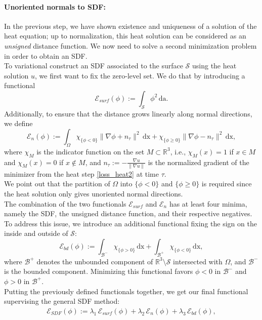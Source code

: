 \documentclass[12pt,openany]{book}
\newcommand{\R}{\mathbb{R}}
\def\S{\mathcal{S}}
\theoremstyle{plainnormal}
\theoremstyle{remark}
\begin{document}
\paragraph{Unoriented normals to SDF:}
In the previous step, we have shown existence and uniqueness of a solution of the heat equation; up to normalization, this heat solution can be considered as an \emph{unsigned} distance function. We now need to solve a second minimization problem in order to obtain an SDF.\\
To variational construct an SDF associated to the surface $\mathcal{S}$ using the heat solution $u$, we first want to fix the zero-level set. We do that by introducing a functional $$\mathcal{E}_{surf}(\phi) := \int_\mathcal{S} \phi^2 \,\mathrm{da}.$$
Additionally, to ensure that the distance grows linearly along normal directions, we define $$\mathcal{E}_{n}(\phi) := \int_\Omega \chi_{\{\phi < 0\}} \|\nabla \phi + n_\tau\|^2 \,\mathrm{dx} + \chi_{\{\phi \geq 0\}} \|\nabla \phi - n_\tau\|^2 \,\mathrm{dx},$$
where $\chi_M$ is the indicator function on the set $M\subset \R^3$, i.e., $\chi_M(x) = 1$ if $x\in M$ and $\chi_M(x) = 0$ if $x\notin M$, and  $n_\tau := - \frac{\nabla u}{\|\nabla u\|}$ is the normalized gradient of the minimizer from the heat step \eqref{loss_heat2} at time $\tau$.\\ 
We point out that the partition of $\Omega$ into $\{\phi < 0\}$ and $\{\phi \geq 0\}$ is required since the heat solution only gives unoriented normal directions.\\
The combination of the two functionals $\mathcal E_{surf}$ and $\mathcal E_{n}$ has at least four minima, namely the SDF, the unsigned distance function, and their respective negatives. To address this issue, we introduce an additional functional fixing the sign on the inside and outside of $\S$: 
$$\mathcal{E}_{bd}(\phi) := \int_{\mathcal{B^-}} \chi_{\{\phi > 0\}} \,\mathrm{dx} + \int_{\mathcal{B^+}}\chi_{\{\phi < 0\}} \,\mathrm{dx},$$
where $\mathcal{B}^+$ denotes the unbounded component of $\R^3\setminus\S$ intersected with $\Omega$, and $\mathcal{B}^-$ is the bounded component. Minimizing this functional favors $\phi < 0$ in $\mathcal B^-$ and $\phi> 0$ in $\mathcal B^+$.\\
Putting the previously defined functionals together, we get our final functional supervising the general SDF method:
\begin{align}\label{E_SDF}
    \mathcal{E}_{SDF}(\phi) := \lambda_1\,\mathcal{E}_{surf} (\phi)+ \lambda_2\,\mathcal{E}_{n}(\phi) + \lambda_3\,\mathcal{E}_{bd}(\phi),
\end{align}
\end{document}
